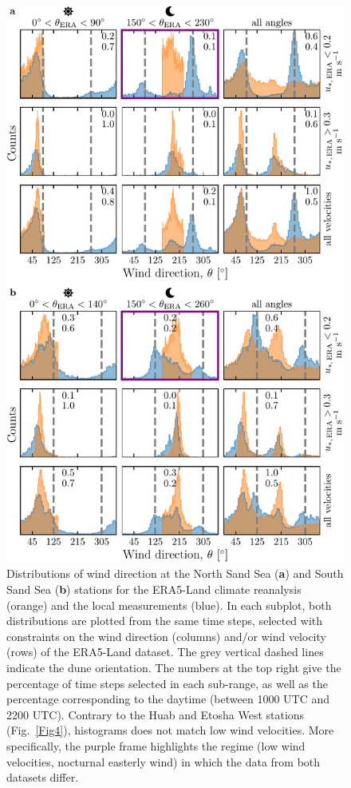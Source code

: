 \begin{figure}
\centering
\includegraphics[scale=1]{Figures/Figure6.pdf}
\caption{Distributions of wind direction at the North Sand Sea (\textbf{a}) and South Sand Sea (\textbf{b}) stations for the ERA5-Land climate reanalysis (orange) and the local measurements (blue). In each subplot, both distributions are plotted from the same time steps, selected with constraints on the wind direction (columns) and/or wind velocity (rows) of the ERA5-Land dataset. The grey vertical dashed lines indicate the dune orientation. The numbers at the top right give the percentage of time steps selected in each sub-range, as well as the percentage corresponding to the daytime (between 1000 UTC and 2200 UTC). Contrary to the Huab and Etosha West stations (Fig.~\ref{Fig4}), histograms does not match low wind velocities. More specifically, the purple frame highlights the regime (low wind velocities, nocturnal easterly wind) in which the data from both datasets differ.}
\label{Fig6}
\end{figure}

